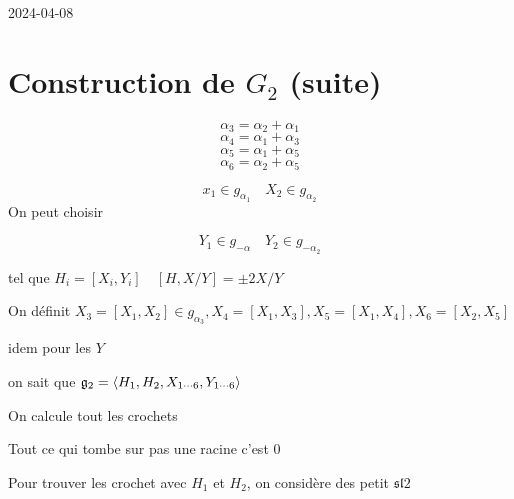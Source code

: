 


2024-04-08

\section*{Construction de \(G_2\) (suite)}

\[ \alpha_3 = \alpha_2 + \alpha_1 \]
\[ \alpha_4 = \alpha_1 + \alpha_3  \]
\[ \alpha_5 = \alpha_1 + \alpha_5  \]
\[ \alpha_6 = \alpha_2 +\alpha_5 \]


\[ x_1 \in g_{\alpha_1} \quad X_2 \in g_{\alpha_{2}}  \]
On peut choisir 

\[ Y_1 \in g_{-\alpha} \quad Y_2 \in g_{-\alpha_2 }  \]

tel que \(H_{i} = [X_i, Y_i] \quad [H, X/Y] = \pm 2 X/Y \)

On définit \(X_3 = [X_1, X_2] \in g_{\alpha_3} , X_4 = [X_1, X_3] , X_5 = [X_1, X_4] , X_6 = [X_2, X_5] \)

idem pour les \(Y\)

on sait que \(\mathfrak{g}_2 = \expval{H_1, H_2 , X_{1\dotsb6} , Y_{1\dotsb6} }\)

On calcule tout les crochets

Tout ce qui tombe sur pas une racine c'est 0

Pour trouver les crochet avec $H_1$ et $H_2$, on considère des petit \(\mathfrak{sl}2\)


